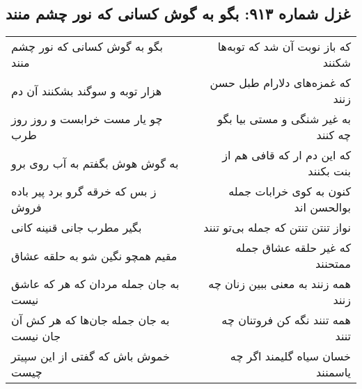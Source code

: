 \begin{center}
\section*{غزل شماره ۹۱۳: بگو به گوش کسانی که نور چشم منند}
\label{sec:0913}
\begin{longtable}{l p{0.5cm} r}
بگو به گوش کسانی که نور چشم منند
&&
که باز نوبت آن شد که توبه‌ها شکنند
\\
هزار توبه و سوگند بشکنند آن دم
&&
که غمزه‌های دلارام طبل حسن زنند
\\
چو یار مست خرابست و روز روز طرب
&&
به غیر شنگی و مستی بیا بگو چه کنند
\\
به گوش هوش بگفتم به آب روی برو
&&
که این دم ار که قافی هم از بنت بکنند
\\
ز بس که خرقه گرو برد پیر باده فروش
&&
کنون به کوی خرابات جمله بوالحسن اند
\\
بگیر مطرب جانی قنینه کانی
&&
نواز تنتن تنتن که جمله بی‌تو تنند
\\
مقیم همچو نگین شو به حلقه عشاق
&&
که غیر حلقه عشاق جمله ممتحنند
\\
به جان جمله مردان که هر که عاشق نیست
&&
همه زنند به معنی ببین زنان چه زنند
\\
به جان جمله جان‌ها که هر کش آن جان نیست
&&
همه تنند نگه کن فروتنان چه تنند
\\
خموش باش که گفتی از این سپیتر چیست
&&
خسان سیاه گلیمند اگر چه یاسمنند
\\
\end{longtable}
\end{center}
